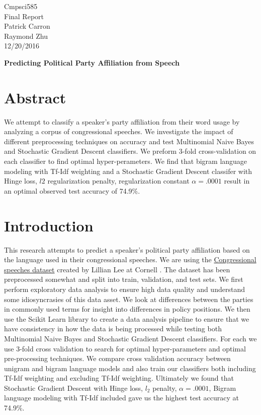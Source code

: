 \documentclass[a4paper, 12pt]{article}
\begin{document}
\noindent
Cmpsci585\\
Final Report\\
Patrick Carron \\
Raymond Zhu\\
12/20/2016 \\
\begin{center}

\textbf{Predicting Political Party Affiliation from Speech}
\end{center}

\section{Abstract}
We attempt to classify a speaker's party affiliation from their word usage by analyzing a corpus of congressional speeches.  We investigate the impact of different preprocessing techniques on accuracy and test Multinomial Naive Bayes and Stochastic Gradient Descent classifiers. We preform 3-fold cross-validation on each classifier to find optimal hyper-perameters. We find that bigram language modeling with Tf-Idf weighting and a Stochastic Gradient Descent classifer with Hinge loss, $l2$ regularization penalty, regularization constant $\alpha=.0001$ result in an optimal observed test accuracy of 74.9\%.
	
	\section{Introduction}
	
	This research attempts to predict a speaker's political party affiliation based on the language used in their congressional speeches. We are using the \href{http://www.cs.cornell.edu/home/llee/data/convote.html}{Congressional speeches dataset} created by Lillian Lee at Cornell \cite{thomas2006get}. The dataset has been preprocessed somewhat and split into train, validation, and test sets.  We first perform exploratory data analysis to ensure high data quality and understand some idiosyncrasies of this data asset. We look at differences between the parties in commonly used terms for insight into differences in policy positions. We then use the \cite{pedregosa2011scikit} Scikit Learn library to create a data analysis pipeline to ensure that we have consistency in how the data is being processed while testing both Multinomial Naive Bayes and Stochastic Gradient Descent classifiers.  For each we use 3-fold cross validation to search for optimal hyper-parameters and optimal pre-processing techniques.  We compare cross validation accuracy between unigram and bigram language models and also train our classifiers both including Tf-Idf weighting and excluding Tf-Idf weighting. Ultimately we found that Stochastic Gradient Descent with Hinge loss, $l_2$ penalty, $\alpha=.0001$,  Bigram language modeling with Tf-Idf included gave us the highest test accuracy at 74.9\%.
	
\end{document}
